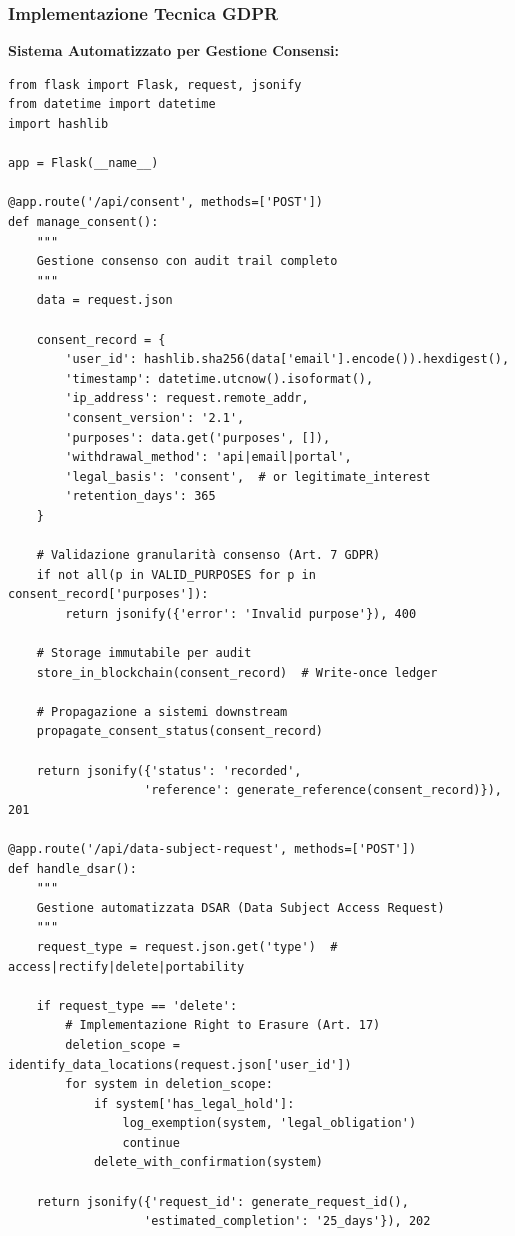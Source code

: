 \subsubsection{Implementazione Tecnica GDPR}

\textbf{Sistema Automatizzato per Gestione Consensi:}
\begin{lstlisting}[caption={API REST per Gestione Consensi GDPR},label={lst:gdpr_consent}]
from flask import Flask, request, jsonify
from datetime import datetime
import hashlib

app = Flask(__name__)

@app.route('/api/consent', methods=['POST'])
def manage_consent():
    """
    Gestione consenso con audit trail completo
    """
    data = request.json
    
    consent_record = {
        'user_id': hashlib.sha256(data['email'].encode()).hexdigest(),
        'timestamp': datetime.utcnow().isoformat(),
        'ip_address': request.remote_addr,
        'consent_version': '2.1',
        'purposes': data.get('purposes', []),
        'withdrawal_method': 'api|email|portal',
        'legal_basis': 'consent',  # or legitimate_interest
        'retention_days': 365
    }
    
    # Validazione granularità consenso (Art. 7 GDPR)
    if not all(p in VALID_PURPOSES for p in consent_record['purposes']):
        return jsonify({'error': 'Invalid purpose'}), 400
    
    # Storage immutabile per audit
    store_in_blockchain(consent_record)  # Write-once ledger
    
    # Propagazione a sistemi downstream
    propagate_consent_status(consent_record)
    
    return jsonify({'status': 'recorded', 
                   'reference': generate_reference(consent_record)}), 201

@app.route('/api/data-subject-request', methods=['POST'])
def handle_dsar():
    """
    Gestione automatizzata DSAR (Data Subject Access Request)
    """
    request_type = request.json.get('type')  # access|rectify|delete|portability
    
    if request_type == 'delete':
        # Implementazione Right to Erasure (Art. 17)
        deletion_scope = identify_data_locations(request.json['user_id'])
        for system in deletion_scope:
            if system['has_legal_hold']:
                log_exemption(system, 'legal_obligation')
                continue
            delete_with_confirmation(system)
    
    return jsonify({'request_id': generate_request_id(),
                   'estimated_completion': '25_days'}), 202
\end{lstlisting}

